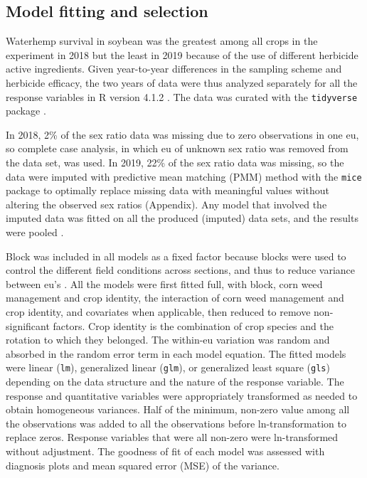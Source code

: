 \documentclass[
]{article}
\begin{document}
\hypertarget{model-fitting-and-selection}{%
\subsection*{Model fitting and selection}\label{model-fitting-and-selection}}

Waterhemp survival in soybean was the greatest among all crops in the experiment in 2018 but the least in 2019 because of the use of different herbicide active ingredients. Given year-to-year differences in the sampling scheme and herbicide efficacy, the two years of data were thus analyzed separately for all the response variables in R version 4.1.2 \citep{rdevelopmentcoreteamLanguageEnvironmentStatistical2021}. The data was curated with the \texttt{tidyverse} package \citep[version 1.3.1,][]{wickhamTidyverseEasilyInstall2021}.

In 2018, 2\% of the sex ratio data was missing due to zero observations in one eu, so complete case analysis, in which eu of unknown sex ratio was removed from the data set, was used. In 2019, 22\% of the sex ratio data was missing, so the data were imputed with predictive mean matching (PMM) method with the \texttt{mice} package \citep[version 3.13.0,][]{vanbuurenMiceMultivariateImputation2011} to optimally replace missing data with meaningful values without altering the observed sex ratios (Appendix). Any model that involved the imputed data was fitted on all the produced (imputed) data sets, and the results were pooled \citep{whiteMultipleImputationUsing2011}.

Block was included in all models as a fixed factor because blocks were used to control the different field conditions across sections, and thus to reduce variance between eu's \citep{dixonShouldBlocksBe2016}. All the models were first fitted full, with block, corn weed management and crop identity, the interaction of corn weed management and crop identity, and covariates when applicable, then reduced to remove non-significant factors. Crop identity is the combination of crop species and the rotation to which they belonged. The within-eu variation was random and absorbed in the random error term in each model equation. The fitted models were linear (\texttt{lm}), generalized linear (\texttt{glm}), or generalized least square (\texttt{gls}) depending on the data structure and the nature of the response variable. The response and quantitative variables were appropriately transformed as needed to obtain homogeneous variances. Half of the minimum, non-zero value among all the observations was added to all the observations before ln-transformation to replace zeros. Response variables that were all non-zero were ln-transformed without adjustment. The goodness of fit of each model was assessed with diagnosis plots and mean squared error (MSE) of the variance.
\end{document}
